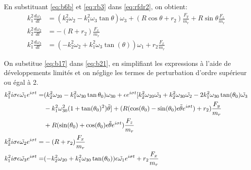 En substituant \ref{eq:b6b} et \ref{eq:rb3} dans \ref{eq:rfdr2}, on obtient:
\begin{align}
    k_1^2\frac{d\omega_1}{dt} &=(k_2^2\omega_2-k_1^2\omega_3 \tan{\theta})\omega_3+(R\cos{\theta}+r_2)\frac{F_y}{m_r}+ R\sin{\theta}\frac{F_z}{m_r} \nonumber \\
    k_2^2\frac{d\omega_2}{dt} &=-(R+r_2) \frac{F_x}{m_r} \nonumber \\
    k_1^2\frac{d\omega_3}{dt} &=(-k_2^2\omega_2+k_1^2\omega_3 \tan(\theta))\omega_1 + r_2 \frac{F_x}{m_r}
  \label{eq:b21}
\end{align}

On substitue \ref{eq:b17} dans \ref{eq:b21}, en simplifiant les expressions à l'aide de développements limités et on néglige les termes de perturbation d'ordre supérieur ou égal à 2.
\begin{align}
    k_1^2 i \sigma\epsilon \Tilde{\omega_1} e^{i \sigma t} =&(k_2^2\omega_{20}-k_1^2\omega_{30} \tan{\theta_0})\omega_{30}+\epsilon e^{i\sigma t}[k_2^2 \omega_{20} \tilde{\omega_3}+k_2^2 \omega_{30} \tilde{\omega_2} -2k_1^2\omega_{30} \tan(\theta_0)\tilde{\omega_3} \nonumber\\
    &-k_1^2 \omega_{30}^2(1+\tan(\theta_0)^2)\tilde{\theta} ]+(R(\cos(\theta_0)- \sin(\theta_0)\epsilon \Tilde{\theta} e^{i \sigma t})+r_2)\frac{F_y}{m_r}\nonumber \\
    &+ R(\sin(\theta_0)+ \cos(\theta_0)\epsilon \Tilde{\theta} e^{i \sigma t})\frac{F_z}{m_r} \nonumber\\ 
    k_2^2 i \sigma\epsilon \Tilde{\omega_2} e^{i \sigma t}=&-(R+r_2) \frac{F_x}{m_r} \nonumber\\ 
    k_1^2 i \sigma\epsilon \Tilde{\omega_3} e^{i \sigma t}=&(-k_2^2\omega_{20}+k_1^2\omega_{30} \tan(\theta_0))\epsilon \Tilde{\omega_1} e^{i \sigma t} + r_2 \frac{F_x}{m_r}
  \label{eq:b22}
\end{align}


